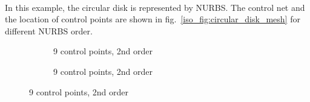 \paragraph{}
In this example, the circular disk is represented by NURBS.
The control net and the location of control points are shown in fig.~\ref{iso_fig:circular_disk_mesh} for different NURBS order.
    \begin{figure}
        \begin{subfigure}[b]{0.5\linewidth}
            \centering
            \caption{9 control points, 2nd order}
        \end{subfigure}
        \begin{subfigure}[b]{0.5\linewidth}
            \centering
            \caption{9 control points, 2nd order}
        \end{subfigure}


\end{figure}

